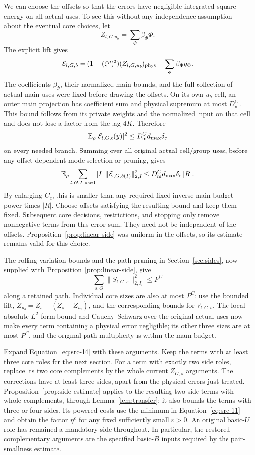 We can choose the offsets so that the errors have negligible
integrated square energy on all actual uses.  To see this without
any independence assumption about the eventual core choices, let
\[
 Z_{l,G,u_b}=\sum_\Phi\beta_\Phi\Phi.
\]
The explicit lift gives
\[
 \mathcal E_{l,G,b}
 =(1-(\zeta^\rho)^2)(Z_{l,G,u_b})_{\mathrm{phys}}
                   -\sum_\Phi\beta_\Phi q_\Phi.
\]
The coefficients \(\beta_\Phi\), their normalized main bounds, and
the full collection of actual main uses were fixed before drawing
the offsets.  On its own \(u_b\)-cell, an outer main projection has
coefficient sum and physical supremum at most \(D_{\mathrm m}^C\).
This bound follows from its private weights and the normalized
input on that cell and does not lose a factor from the lag \(4K\).
Therefore
\[
 \mathbb E_\rho|\mathcal E_{l,G,b}(y)|^2
       \le D_{\mathrm m}^C d_{\max}\delta_c
\]
on every needed branch.  Summing over all original actual
cell/group uses, before any offset-dependent mode selection or
pruning, gives
\[
 \mathbb E_\rho
 \sum_{l,G,I\ {\rm used}}|I|\,
      \|\mathcal E_{l,G,b(I)}\|_{2,I}^2
       \le D_{\mathrm m}^C d_{\max}\delta_c\,|R|.
\]
By enlarging \(C_c\), this is smaller than any required fixed
inverse main-budget power times \(|R|\).
Choose offsets satisfying the resulting bound and keep them fixed.
Subsequent core decisions, restrictions, and stopping only remove
nonnegative terms from this error sum.  They need not be independent
of the offsets.  Proposition~\ref{prop:linear-side} was uniform in
the offsets, so its estimate remains valid for this choice.

The rolling variation bounds and the path pruning in
Section~\ref{sec:sides}, now supplied with
Proposition~\ref{prop:linear-side}, give
\[
 \sum_{s,G}\|S_{l,G,s}\|_{2,I_s}^2\le P^C
\]
along a retained path.  Individual core sizes are also at most
\(P^C\): use the bounded lift,
\(Z_{u_b}=Z_s-(Z_s-Z_{u_b})\), and the corresponding bounds for
\(V_{l,G,b}\).  The local absolute \(L^2\) form bound and
Cauchy--Schwarz over the original actual uses now make every term
containing a physical error negligible; its other three sizes are
at most \(P^C\), and the original path multiplicity is within the
main budget.

Expand Equation~\eqref{eq:src-14} with these arguments.  Keep the
terms with at least three core roles for the next section.
For a term with exactly two side roles, replace its two core
complements by the whole current \(Z_{G,s}\) arguments.
The corrections have at least three sides, apart from the physical
errors just treated.  Proposition~\ref{prop:side-estimate} applies
to the resulting two-side terms with whole complements, through
Lemma~\ref{lem:transfer}; it also bounds the terms with three or
four sides.  Its powered costs use the minimum in
Equation~\eqref{eq:src-11} and obtain the factor
\(\eta^\varepsilon\) for any fixed sufficiently small
\(\varepsilon>0\).
An original basic-\(U\) role has remained a mandatory side throughout.
In particular, the restored complementary arguments are the
specified basic-\(B\) inputs required by the pair-smallness estimate.

